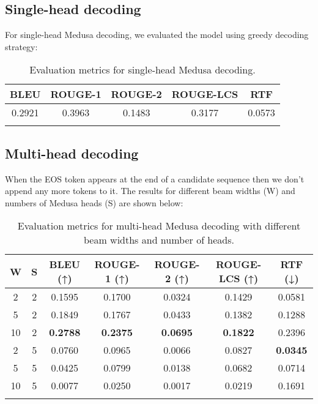 \documentclass[11pt]{article}
\begin{document}
\subsection{Single-head decoding}
For single-head Medusa decoding, we evaluated the model using greedy decoding strategy:

\begin{longtable}{|c|c|c|c|c|}
    \hline
    \textbf{BLEU} & \textbf{ROUGE-1} & \textbf{ROUGE-2} & \textbf{ROUGE-LCS} & \textbf{RTF} \\
    \hline
    0.2921 & 0.3963 & 0.1483 & 0.3177 & 0.0573 \\
    \hline
    \caption{Evaluation metrics for single-head Medusa decoding.}
\end{longtable}

\subsection{Multi-head decoding}
When the EOS token appears at the end of a candidate sequence then we don't append any more tokens to it.
The results for different beam widths (W) and numbers of Medusa heads (S) are shown below:

\begin{longtable}{|c|c|c|c|c|c|c|}
    \hline
    \textbf{W} & \textbf{S} & \textbf{BLEU} (↑) & \textbf{ROUGE-1} (↑) & \textbf{ROUGE-2} (↑) & \textbf{ROUGE-LCS} (↑) & \textbf{RTF} (↓) \\
    \hline
        2 & 2 & 0.1595 & 0.1700 & 0.0324 & 0.1429 & 0.0581 \\
        \hline
        5 & 2 & 0.1849 & 0.1767 & 0.0433 & 0.1382 & 0.1288 \\
        \hline
        10 & 2 & \textbf{0.2788} & \textbf{0.2375} & \textbf{0.0695} & \textbf{0.1822} & 0.2396 \\
        \hline
        2 & 5 & 0.0760 & 0.0965 & 0.0066 & 0.0827 & \textbf{0.0345} \\
        \hline
        5 & 5 & 0.0425 & 0.0799 & 0.0138 & 0.0682 & 0.0714 \\
        \hline
        10 & 5 & 0.0077 & 0.0250 & 0.0017 & 0.0219 & 0.1691 \\
        \hline
    \caption{Evaluation metrics for multi-head Medusa decoding with different beam widths and number of heads.}
\end{longtable}
\end{document}
